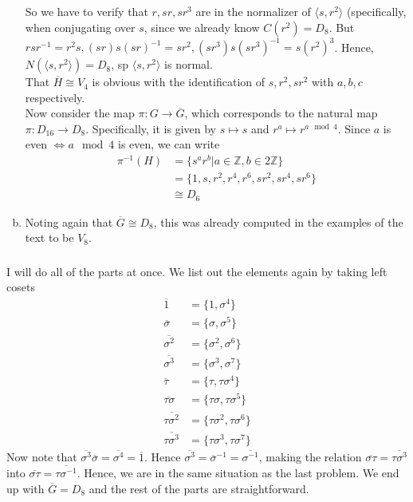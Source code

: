 \documentclass{article}
\newcommand{\ints}{\mathbb{Z}}
\newcommand{\set}[1]{ \{ #1 \} }
\newcommand{\inv}[1]{ {#1}^{-1} }
\newcommand{\iso}{ \cong }
\renewcommand{\bar}{\overline}
\newcommand{\cyclic}[1]{\langle#1\rangle}
\newcommand{\vbar}{\vert}
\begin{document}
\begin{enumerate}[(a)]
So we have to verify that $r,sr,sr^3$ are in the normalizer of $\cyclic{s,r^2}$ (specifically, when conjugating over $s$, since we already know $C(r^2) = D_8$. But $rs\inv{r} = r^2s, (sr)s(sr)^{-1} = sr^2, (sr^3)s(sr^3)^{-1} = s(r^2)^3$. Hence, $N(\cyclic{s,r^2}) = D_8$, sp $\cyclic{s,r^2}$ is normal.\\
That $\bar{H} \iso V_4$ is obvious with the identification of $s,r^2,sr^2$ with $a,b,c$ respectively.\\
Now consider the map $\pi: G \to \bar{G}$, which corresponds to the natural map $\pi: D_{16} \to D_8$. Specifically, it is given by $s \mapsto s$ and $r^a \mapsto r^{a \mod 4}$. Since $a$ is even $\iff a \mod 4$ is even, we can write
\begin{align*}
\inv{\pi}(H) &= \set{s^ar^b \vbar a\in\ints, b\in2\ints}\\
&= \set{1,s,r^2,r^4,r^6,sr^2,sr^4,sr^6}\\
&\iso D_6
\end{align*}
\item Noting again that $\bar{G} \iso D_8$, this was already computed in the examples of the text to be $V_8$.
\end{enumerate}
\subsubsection{}\label{ex1p18}
I will do all of the parts at once. We list out the elements again by taking left cosets\\
\begin{align*}
\bar{1} &= \set{1,\sigma^4}\\
\bar{\sigma} &= \set{\sigma,\sigma^5}\\
\bar{\sigma^2} &= \set{\sigma^2,\sigma^6}\\
\bar{\sigma^3} &= \set{\sigma^3,\sigma^7}\\
\bar{\tau} &= \set{\tau,\tau\sigma^4}\\
\bar{\tau \sigma} &= \set{\tau \sigma,\tau\sigma^5}\\
\bar{\tau\sigma^2} &= \set{\tau\sigma^2,\tau\sigma^6}\\
\bar{\tau\sigma^3} &= \set{\tau\sigma^3,\tau\sigma^7}
\end{align*}
Now note that $\bar{\sigma^3}\bar{\sigma} = \bar{\sigma^4} = \bar{1}$. Hence $\bar{\sigma^3}=\bar{\sigma}^{-1} = \bar{\inv{\sigma}}$, making the relation $\bar{\sigma\tau} = \bar{\tau\sigma^3}$ into $\bar{\sigma\tau} =\bar{\tau\inv{\sigma}}$. Hence, we are in the same situation as the last problem. We end up with $\bar{G} = D_8$ and the rest of the parts are straightforward.
\end{document}
